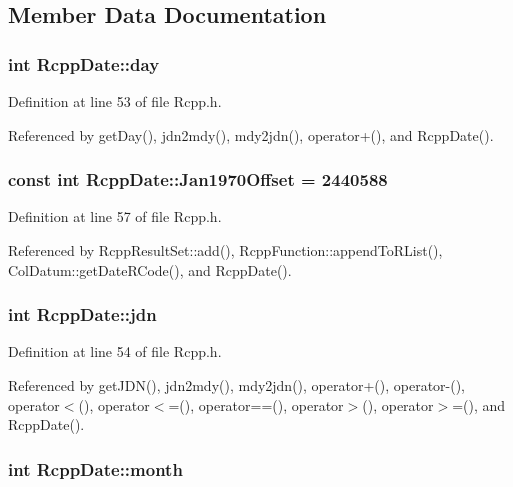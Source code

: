 \subsection{Member Data Documentation}
\hypertarget{classRcppDate_a9e6aec176d9432829a304550eadd4205}{
\subsubsection[{day}]{\setlength{\rightskip}{0pt plus 5cm}int {\bf RcppDate::day}}}
\label{classRcppDate_a9e6aec176d9432829a304550eadd4205}


Definition at line 53 of file Rcpp.h.

Referenced by getDay(), jdn2mdy(), mdy2jdn(), operator+(), and RcppDate().\hypertarget{classRcppDate_a44b0643ab19489a0fb9700d25f504902}{
\subsubsection[{Jan1970Offset}]{\setlength{\rightskip}{0pt plus 5cm}const int {\bf RcppDate::Jan1970Offset} = 2440588}}
\label{classRcppDate_a44b0643ab19489a0fb9700d25f504902}


Definition at line 57 of file Rcpp.h.

Referenced by RcppResultSet::add(), RcppFunction::appendToRList(), ColDatum::getDateRCode(), and RcppDate().\hypertarget{classRcppDate_ab883f696379dd06e39c6c9b3502a2164}{
\subsubsection[{jdn}]{\setlength{\rightskip}{0pt plus 5cm}int {\bf RcppDate::jdn}}}
\label{classRcppDate_ab883f696379dd06e39c6c9b3502a2164}


Definition at line 54 of file Rcpp.h.

Referenced by getJDN(), jdn2mdy(), mdy2jdn(), operator+(), operator-\/(), operator$<$(), operator$<$=(), operator==(), operator$>$(), operator$>$=(), and RcppDate().\hypertarget{classRcppDate_a00bf3ece7320d63aee4f6b6df82b4f63}{
\subsubsection[{month}]{\setlength{\rightskip}{0pt plus 5cm}int {\bf RcppDate::month}}}
\label{classRcppDate_a00bf3ece7320d63aee4f6b6df82b4f63}


